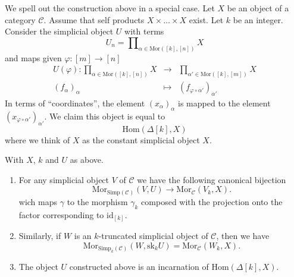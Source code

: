 \noindent
We spell out the construction above in a special case.
Let $X$ be an object of a category $\mathcal{C}$.
Assume that self products $X \times \ldots \times X$ exist.
Let $k$ be an integer.
Consider the simplicial object $U$ with terms
$$
U_n = \prod\nolimits_{\alpha \in \text{Mor}([k], [n])} X
$$
and maps given $\varphi : [m] \to [n]$
\begin{eqnarray*}
U(\varphi) :
\prod\nolimits_{\alpha \in \text{Mor}([k], [n])} X
& \longrightarrow &
\prod\nolimits_{\alpha' \in \text{Mor}([k], [m])} X \\
(f_{\alpha})_{\alpha} & \longmapsto &
(f_{\varphi \circ \alpha'})_{\alpha'}
\end{eqnarray*}
In terms of ``coordinates'', the element $(x_\alpha)_\alpha$
is mapped to the element $(x_{\varphi \circ \alpha'})_{\alpha'}$.
We claim this object is equal to
$$
\text{Hom}(\Delta[k], X)
$$
where we think of $X$ as the constant simplicial object $X$.

\begin{lemma}
\label{lemma-morphism-into-product}
With $X$, $k$ and $U$ as above.
\begin{enumerate}
\item For any simplicial object $V$ of
$\mathcal{C}$ we have the following
canonical bijection
$$
\text{Mor}_{\text{Simp}(\mathcal{C})}(V, U)
\longrightarrow
\text{Mor}_{\mathcal{C}}(V_k, X).
$$
wich maps $\gamma$ to the morphism $\gamma_k$ composed with
the projection onto the factor corresponding to $\text{id}_{[k]}$.
\item Similarly, if $W$ is an $k$-truncated simplicial object
of $\mathcal{C}$, then we have
$$
\text{Mor}_{\text{Simp}_k(\mathcal{C})}(W, \text{sk}_k U)
=
\text{Mor}_{\mathcal{C}}(W_k, X).
$$
\item The object $U$ constructed above is an
incarnation of $\text{Hom}(\Delta[k], X)$.
\end{enumerate}
\end{lemma}

